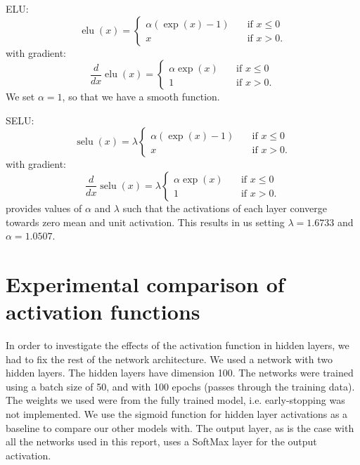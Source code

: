 \documentclass{article}
\DeclareMathOperator{\elu}{elu}
\DeclareMathOperator{\selu}{selu}
\begin{document}
ELU: 
\begin{equation}
  \elu(x) =
     \begin{cases} 
      \alpha (\exp(x) - 1)      & \quad \text{if } x \leq  0 \\
      x       & \quad \text{if } x > 0 .
    \end{cases} 
\end{equation} 
with gradient:
\begin{equation}
  \frac{d}{dx} \elu(x) =
     \begin{cases} 
      \alpha\exp(x)      & \quad \text{if } x \leq  0 \\
      1       & \quad \text{if } x > 0 .
    \end{cases} 
\end{equation}
We set $\alpha = 1$, so that we have a smooth function.

SELU: 
\begin{equation}
  \selu(x) =
     \lambda \begin{cases} 
      \alpha (\exp(x) - 1)      & \quad \text{if } x \leq  0 \\
      x       & \quad \text{if } x > 0 .
    \end{cases} 
\end{equation} 
with gradient:
\begin{equation}
  \frac{d}{dx} \selu(x) =
     \lambda \begin{cases} 
      \alpha\exp(x)      & \quad \text{if } x \leq  0 \\
      1       & \quad \text{if } x > 0 .
    \end{cases} 
\end{equation}
\citep{Klambauer17} provides values of $\alpha$ and $\lambda$ such that the activations of each layer converge towards zero mean and unit activation. This results in us setting $\lambda = 1.6733$ and $\alpha = 1.0507$.
\section{Experimental comparison of activation functions}
\label{sec:actexpts}
In order to investigate the effects of the activation function in hidden layers, we had to fix the rest of the network architecture. We used a network with two hidden layers. The hidden layers have dimension 100. The networks were trained using a batch size of 50, and with 100 epochs (passes through the training data). The weights we used were from the fully trained model, i.e. early-stopping was not implemented. We use the sigmoid function for hidden layer activations as a baseline to compare our other models with. The output layer, as is the case with all the networks used in this report, uses a SoftMax layer for the output activation. 
\end{document}
